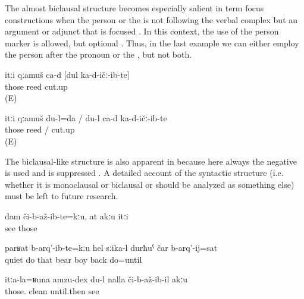 The almost biclausal structure becomes especially salient in term focus constructions when the person  or the  is not following the verbal complex but an argument or adjunct that is focused . In this context, the use of the person marker is allowed, but optional . Thus, in the last example we can either employ the person  after the pronoun or the , but not both.
%
\begin{exe}
	\ex	\label{ex:It is the reed that I cut analytic}
	\gll	itːi	qːamuš	ca-d	[dul		ka-d-ičː-ib-te]	\\
		those	reed 			cut.up\\
	\glt	{} (E) 

	\ex	\label{ex:It is me who cut the reed analytic}
	\gll	itːi	qːamuš		du-l=da	/ du-l ca-d ka-d-ičː-ib-te	\\
		those	reed		/   cut.up\\
	\glt	{} (E)
\end{exe}

The biclausal-like structure is also apparent in  because here always the negative   is used and  is suppressed . A detailed account of the syntactic structure (i.e. whether it is monoclausal or biclausal or should be analyzed as something else) must be left to future research.
%
\begin{exe}
	\ex	\label{ex:I did not see them, you also (did not see them)}
	\gll	dam	či-b-až-ib-te=kːu,	at	akːu	itːi\\
			see		 	those\\
	\glt	{}

	\ex	\label{ex:‎The bear was not quiet before they did give it its cub back}
	\gll	parʁat	b-arq'-ib-te=kːu	hel	sːika-l		durħuˁ	čar	b-arq'-ij=sat\\
		quiet	do	that	bear	boy	back	do=until\\
	\glt	{}

	\ex	\label{ex:‎A cleanness like theirs I have seen nowhere analytic}
	\gll	itːa-la=ʁuna	amzu-dex	du-l	nalla	či-b-až-ib-il	akːu\\
		those.	clean		until.then	see	\\
	\glt	{}
\end{exe}


